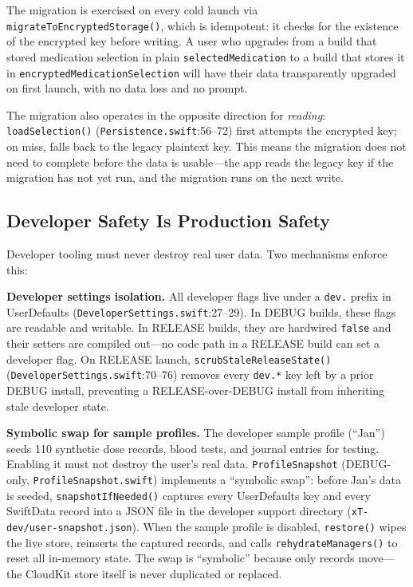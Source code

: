 \documentclass[11pt,a4paper]{article}
\newcommand{\code}[1]{\texttt{\small #1}}
\begin{document}
The migration is exercised on every cold launch via
\code{migrateToEncryptedStorage()}, which is idempotent: it checks for the
existence of the encrypted key before writing. A user who upgrades from a
build that stored medication selection in plain \code{selectedMedication} to a
build that stores it in \code{encryptedMedicationSelection} will have their
data transparently upgraded on first launch, with no data loss and no
prompt.

The migration also operates in the opposite direction for \emph{reading}:
\code{loadSelection()} (\code{Persistence.swift}:56--72) first attempts the
encrypted key; on miss, falls back to the legacy plaintext key. This means
the migration does not need to complete before the data is usable---the app
reads the legacy key if the migration has not yet run, and the migration
runs on the next write.

\subsection{Developer Safety Is Production Safety}
\label{sec:developer_safety}

Developer tooling must never destroy real user data. Two mechanisms enforce
this:

\textbf{Developer settings isolation.} All developer flags live under a
\code{dev.} prefix in UserDefaults (\code{DeveloperSettings.swift}:27--29).
In DEBUG builds, these flags are readable and writable. In RELEASE builds,
they are hardwired \code{false} and their setters are compiled out---no code
path in a RELEASE build can set a developer flag. On RELEASE launch,
\code{scrubStaleReleaseState()} (\code{DeveloperSettings.swift}:70--76)
removes every \code{dev.*} key left by a prior DEBUG install, preventing a
RELEASE-over-DEBUG install from inheriting stale developer state.

\textbf{Symbolic swap for sample profiles.} The developer sample profile
(``Jan'') seeds 110 synthetic dose records, blood tests, and journal entries
for testing. Enabling it must not destroy the user's real data.
\code{ProfileSnapshot} (DEBUG-only, \code{ProfileSnapshot.swift}) implements
a ``symbolic swap'': before Jan's data is seeded,
\code{snapshotIfNeeded()} captures every UserDefaults key and every
SwiftData record into a JSON file in the developer support directory
(\verb|xT-dev/user-snapshot.json|). When the sample profile is disabled,
\code{restore()} wipes the live store, reinserts the captured records, and
calls \code{rehydrateManagers()} to reset all in-memory state. The swap is
``symbolic'' because only records move---the CloudKit store itself is never
duplicated or replaced.
\end{document}

